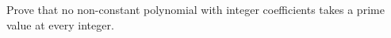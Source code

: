 Prove that no non-constant polynomial with integer coefficients takes a prime value at every integer.
